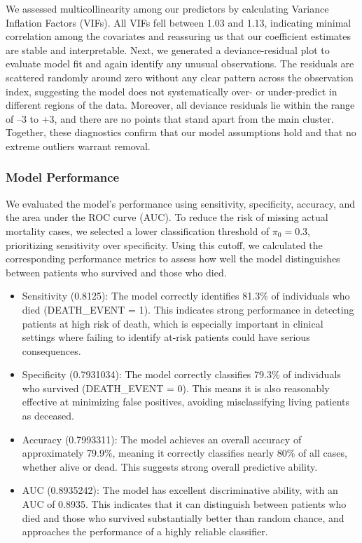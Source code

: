 \documentclass[
  letterpaper,
  DIV=11,
  numbers=noendperiod]{scrartcl}
\begin{document}
We assessed multicollinearity among our predictors by calculating
Variance Inflation Factors (VIFs). All VIFs fell between 1.03 and 1.13,
indicating minimal correlation among the covariates and reassuring us
that our coefficient estimates are stable and interpretable. Next, we
generated a deviance‐residual plot to evaluate model fit and again
identify any unusual observations. The residuals are scattered randomly
around zero without any clear pattern across the observation index,
suggesting the model does not systematically over- or under-predict in
different regions of the data. Moreover, all deviance residuals lie
within the range of --3 to +3, and there are no points that stand apart
from the main cluster. Together, these diagnostics confirm that our
model assumptions hold and that no extreme outliers warrant removal.

\hypertarget{model-performance}{%
\subsubsection{Model Performance}\label{model-performance}}

We evaluated the model's performance using sensitivity, specificity,
accuracy, and the area under the ROC curve (AUC). To reduce the risk of
missing actual mortality cases, we selected a lower classification
threshold of \(\pi_0 = 0.3\), prioritizing sensitivity over specificity.
Using this cutoff, we calculated the corresponding performance metrics
to assess how well the model distinguishes between patients who survived
and those who died.

\begin{itemize}
\item
  Sensitivity (0.8125): The model correctly identifies 81.3\% of
  individuals who died (DEATH\_EVENT = 1). This indicates strong
  performance in detecting patients at high risk of death, which is
  especially important in clinical settings where failing to identify
  at-risk patients could have serious consequences.
\item
  Specificity (0.7931034): The model correctly classifies 79.3\% of
  individuals who survived (DEATH\_EVENT = 0). This means it is also
  reasonably effective at minimizing false positives, avoiding
  misclassifying living patients as deceased.
\item
  Accuracy (0.7993311): The model achieves an overall accuracy of
  approximately 79.9\%, meaning it correctly classifies nearly 80\% of
  all cases, whether alive or dead. This suggests strong overall
  predictive ability.
\item
  AUC (0.8935242): The model has excellent discriminative ability, with
  an AUC of 0.8935. This indicates that it can distinguish between
  patients who died and those who survived substantially better than
  random chance, and approaches the performance of a highly reliable
  classifier.
\end{itemize}
\end{document}
